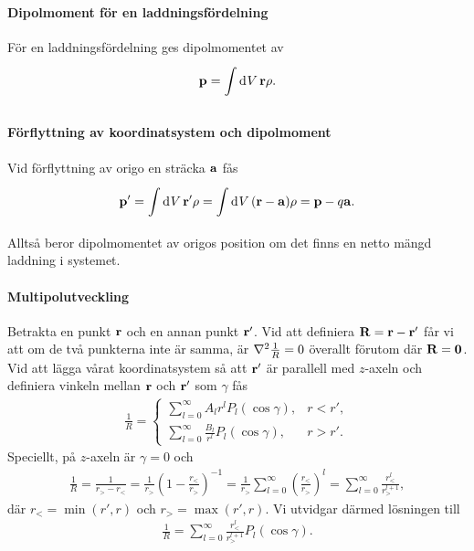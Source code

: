 \paragraph{Dipolmoment för en laddningsfördelning}
För en laddningsfördelning ges dipolmomentet av
\begin{align*}
	\vb{p} = \int\limits_{}^{}\dd[]{V}\vb{r}\rho.
\end{align*}

\paragraph{Förflyttning av koordinatsystem och dipolmoment}
Vid förflyttning av origo en sträcka $\vb{a}$ fås
\begin{align*}
	\vb{p}' = \int\limits_{}^{}\dd[]{V}\vb{r}'\rho = \int\limits_{}^{}\dd[]{V}(\vb{r} - \vb{a})\rho = \vb{p} - q\vb{a}.
\end{align*}
Alltså beror dipolmomentet av origos position om det finns en netto mängd laddning i systemet.

\paragraph{Multipolutveckling}
Betrakta en punkt $\vb{r}$ och en annan punkt $\vb{r}'$. Vid att definiera $\vb{R} = \vb{r} - \vb{r}'$ får vi att om de två punkterna inte är samma, är $\laplacian{\frac{1}{R}} = 0$ överallt förutom där $\vb{R} = \vb{0}$. Vid att lägga vårat koordinatsystem så att $\vb{r}'$ är parallell med $z$-axeln och definiera vinkeln mellan $\vb{r}$ och $\vb{r}'$ som $\gamma$ fås
\begin{align*}
	\frac{1}{R} =
	\begin{cases}
		\sum\limits_{l = 0}^{\infty}A_{l}r^{l}P_{l}(\cos{\gamma}),          &r < r', \\
		\sum\limits_{l = 0}^{\infty}\frac{B_{l}}{r^{l}}P_{l}(\cos{\gamma}), &r > r'.
	\end{cases}
\end{align*}
Speciellt, på $z$-axeln är $\gamma = 0$ och
\begin{align*}
	\frac{1}{R} = \frac{1}{r_{>} - r_{<}} = \frac{1}{r_{>}}\left(1 - \frac{r_{<}}{r_{>}}\right)^{-1} = \frac{1}{r_{>}}\sum\limits_{l = 0}^{\infty}\left(\frac{r_{<}}{r_{>}}\right)^{l} = \sum\limits_{l = 0}^{\infty}\frac{r_{<}^{l}}{r_{>}^{l + 1}},
\end{align*}
där $r_{<} = \min(r', r)$ och $r_{>} = \max(r', r)$. Vi utvidgar därmed lösningen till
\begin{align*}
	\frac{1}{R} = \sum\limits_{l = 0}^{\infty}\frac{r_{<}^{l}}{r_{>}^{l + 1}}P_{l}(\cos{\gamma}).
\end{align*}

